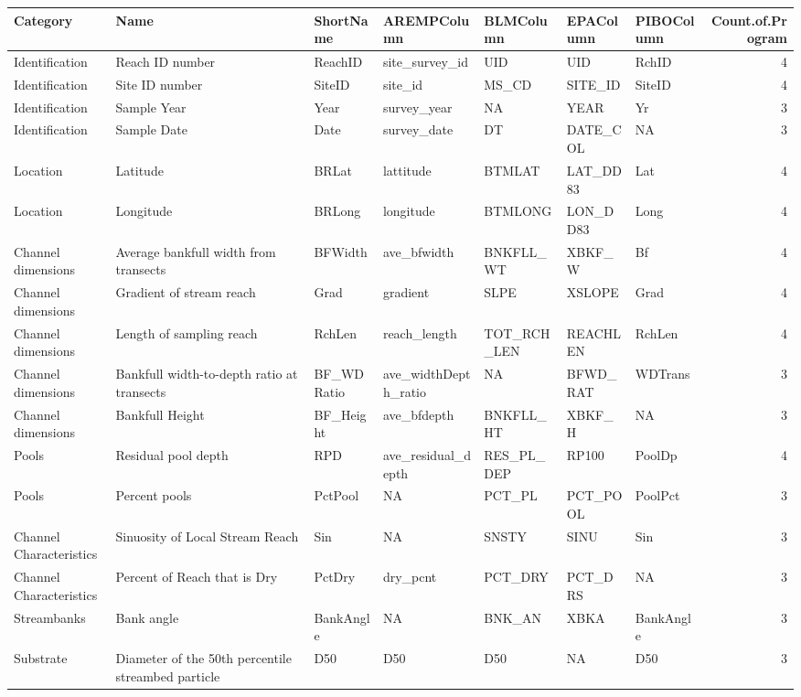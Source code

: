 \documentclass[]{article}
\begin{document}
\begin{table}[H]
\centering
\begin{tabular}{l|l|l|l|l|l|l|r}
\hline
Category & Name & ShortName & AREMPColumn & BLMColumn & EPAColumn & PIBOColumn & Count.of.Program\\
\hline
Identification & Reach ID number & ReachID & site\_survey\_id & UID & UID & RchID & 4\\
\hline
Identification & Site ID number & SiteID & site\_id & MS\_CD & SITE\_ID & SiteID & 4\\
\hline
Identification & Sample Year & Year & survey\_year & NA & YEAR & Yr & 3\\
\hline
Identification & Sample Date & Date & survey\_date & DT & DATE\_COL & NA & 3\\
\hline
Location & Latitude & BRLat & lattitude & BTMLAT & LAT\_DD83 & Lat & 4\\
\hline
Location & Longitude & BRLong & longitude & BTMLONG & LON\_DD83 & Long & 4\\
\hline
Channel dimensions & Average bankfull width from transects & BFWidth & ave\_bfwidth & BNKFLL\_WT & XBKF\_W & Bf & 4\\
\hline
Channel dimensions & Gradient of stream reach & Grad & gradient & SLPE & XSLOPE & Grad & 4\\
\hline
Channel dimensions & Length of sampling reach & RchLen & reach\_length & TOT\_RCH\_LEN & REACHLEN & RchLen & 4\\
\hline
Channel dimensions & Bankfull width-to-depth ratio at transects & BF\_WDRatio & ave\_widthDepth\_ratio & NA & BFWD\_RAT & WDTrans & 3\\
\hline
Channel dimensions & Bankfull Height & BF\_Height & ave\_bfdepth & BNKFLL\_HT & XBKF\_H & NA & 3\\
\hline
Pools & Residual pool depth & RPD & ave\_residual\_depth & RES\_PL\_DEP & RP100 & PoolDp & 4\\
\hline
Pools & Percent pools & PctPool & NA & PCT\_PL & PCT\_POOL & PoolPct & 3\\
\hline
Channel Characteristics & Sinuosity of Local Stream Reach & Sin & NA & SNSTY & SINU & Sin & 3\\
\hline
Channel Characteristics & Percent of Reach that is Dry & PctDry & dry\_pcnt & PCT\_DRY & PCT\_DRS & NA & 3\\
\hline
Streambanks & Bank angle & BankAngle & NA & BNK\_AN & XBKA & BankAngle & 3\\
\hline
Substrate & Diameter of the 50th percentile streambed particle & D50 & D50 & D50 & NA & D50 & 3\\

\end{tabular}
\end{table}
\end{document}
